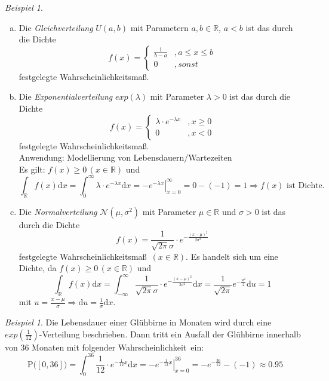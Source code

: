 \documentclass[a4paper,12pt,fleqn]{scrartcl}
\newcommand{\R}{\mathbb{R}}
\newcommand{\m}[1]{\mathcal{ #1 }}
\newcommand{\p}[1]{\text{P(} #1 \text{)}}
\newcommand{\WM}{Wahrscheinlichkeitsmaß}
\newcommand{\Wk}{Wahrscheinlichkeit}
\newcommand{\impl}{\Rightarrow}
\theoremstyle{definition}
\theoremstyle{plain}
\theoremstyle{remark}
\newtheorem{beispiel}[definition]{Beispiel}
\begin{document}
\begin{beispiel}
\begin{enumerate}[a)]
\item Die \emph{Gleichverteilung} $U(a,b)$ mit Parametern $a,b\in\R$, $a<b$ ist das durch die Dichte
\[f(x)=\begin{cases}\frac{1}{b-a}&,a\leq x\leq b\\
0&,sonst
\end{cases}\]
festgelegte \WM.

\item Die \emph{Exponentialverteilung} $exp(\lambda)$ mit Parameter $\lambda > 0$ ist das durch die Dichte
\[f(x)=\begin{cases}\lambda \cdot e^{-\lambda x} &,x \geq 0 \\ 0 &, x < 0\end{cases}\]
festgelegte \WM.\\
Anwendung: Modellierung von Lebensdauern/Wartezeiten\\
Es gilt: $f(x) \geq 0 \, (x \in \R)$ und
\[\int_{\R}f(x)\mathrm{d}x = \int_0^\infty \lambda \cdot e^{-\lambda x} \mathrm{d}x = \left. -e^{-\lambda x} \right|_{x=0}^\infty = 0 - (-1) = 1 \impl f(x) \text{ ist Dichte.}\]
\item Die \emph{Normalverteilung} $\m{N}(\mu, \sigma^2)$ mit Parameter $\mu \in \R$ und $\sigma > 0$ ist das durch die Dichte
\[f(x)=\frac{1}{\sqrt{2\pi} \sigma} \cdot e^{-\frac{(x-\mu)^2}{2 \sigma^2}}\]
festgelegte \WM \, $(x \in \R)$. Es handelt sich um eine Dichte, da $f(x) \geq 0 \, (x \in \R)$ und
\[\int_{\R}f(x)\mathrm{d}x = \int_{-\infty}^{\infty} \frac{1}{\sqrt{2\pi} \sigma} \cdot e^{-\frac{(x-\mu)^2}{2 \sigma^2}} \mathrm{d}x = \frac{1}{\sqrt{2 \pi}} e^{-\frac{u^2}{2}} \mathrm{d}u = 1\]
mit $u = \frac{x-\mu}{\sigma} \impl \mathrm{d}u = \frac{1}{\sigma} \mathrm{d}x$.
\end{enumerate}
\end{beispiel}
\begin{beispiel}
Die Lebensdauer einer Glühbirne in Monaten wird durch eine $exp(\frac{1}{12})$-Verteilung beschrieben. Dann tritt ein Ausfall der Glühbirne innerhalb von 36 Monaten mit folgender \Wk \, ein:
\[\p{[0,36]} = \int_0^{36} \frac{1}{12} \cdot e^{-\frac{1}{12}x} \mathrm{d}x = \left. -e^{-\frac{1}{12}x} \right|_{x=0}^{36} = -e^{-\frac{36}{12}}-(-1) \approx 0.95\]
\end{beispiel}
\end{document}

